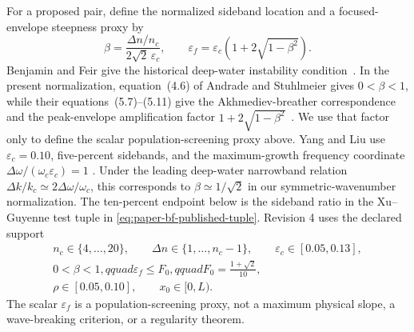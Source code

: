 For a proposed pair, define the normalized sideband location and a
focused-envelope steepness proxy by
\begin{equation}
  \beta
  =\frac{\Delta n/n_c}{2\sqrt{2}\,\varepsilon_c},
  \qquad
  \varepsilon_f
  =\varepsilon_c\left(1+2\sqrt{1-\beta^2}\right).
  \label{eq:paper-bf-band}
\end{equation}
Benjamin and Feir give the historical deep-water instability
condition~\cite{benjaminfeir1967}.  In the present normalization,
equation~(4.6) of Andrade and Stuhlmeier gives $0<\beta<1$, while their
equations~(5.7)--(5.11) give the Akhmediev-breather correspondence and the
peak-envelope amplification factor
$1+2\sqrt{1-\beta^2}$~\cite{andrade2023}.  We use that factor only to define
the scalar population-screening proxy above.  Yang and Liu use
$\varepsilon_c=0.10$, five-percent sidebands, and the maximum-growth
frequency coordinate $\Delta\omega/(\omega_c\varepsilon_c)=1$
\cite[Sec.~4.3.1]{yangliu2024}.  Under the leading deep-water narrowband
relation $\Delta k/k_c\simeq2\Delta\omega/\omega_c$, this corresponds to
$\beta\simeq1/\sqrt2$ in our symmetric-wavenumber normalization.  The
ten-percent endpoint below is the sideband ratio in the Xu--Guyenne test tuple in
\cref{eq:paper-bf-published-tuple}.  Revision 4 uses the declared support
\begin{equation}
  \begin{gathered}
    n_c\in\{4,\ldots,20\},\qquad
    \Delta n\in\{1,\ldots,n_c-1\},\qquad
    \varepsilon_c\in[0.05,0.13],\\
    0<\beta<1,qquad
    \varepsilon_f\leq F_0,qquad
    F_0=\frac{1+\sqrt2}{10},\\
    \rho\in[0.05,0.10],\qquad x_0\in[0,L).
  \end{gathered}
  \label{eq:paper-bf-support}
\end{equation}
The scalar $\varepsilon_f$ is a population-screening proxy, not a maximum
physical slope, a wave-breaking criterion, or a regularity theorem.


